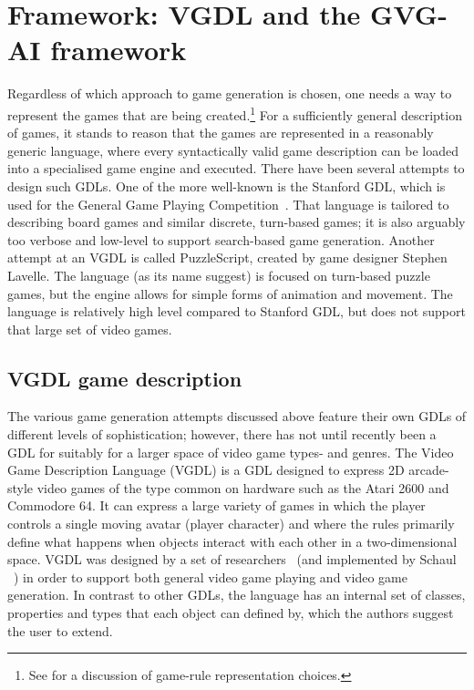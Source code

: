 \documentclass[a4paper,titlepage,final]{report}
\begin{document}
\section{Framework: VGDL and the GVG-AI framework}
\label{sec_gvgaiframework}
Regardless of which approach to game generation is chosen, one needs a way to represent the games that are being created.\footnote{See \citet{pcgbook:ch6} for a discussion of game-rule representation choices.} For a sufficiently general description of games, it stands to reason that the games are represented in a reasonably generic language, where every syntactically valid game description can be loaded into a specialised game engine and executed. 
There have been several attempts to design such GDLs. One of the more well-known is the Stanford GDL, which is used for the General Game Playing Competition~\citet{genesereth2005general}. That language is tailored to describing board games and similar discrete, turn-based games; it is also arguably too verbose and low-level to support search-based game generation. 
Another attempt at an VGDL is called PuzzleScript, created by game designer Stephen Lavelle. The language (as its name suggest) is focused on turn-based puzzle games, but the engine allows for simple forms of animation and movement. The language is relatively high level compared to Stanford GDL, but does not support that large set of video games.


\subsection{VGDL game description}
\label{ssec_vgdl}
The various game generation attempts discussed above feature their own GDLs of different levels of sophistication; however, there has not until recently been a GDL for suitably for a larger space of video game types- and genres.
The Video Game Description Language (VGDL) is a GDL designed to express 2D arcade-style video games of the type common on hardware such as the Atari 2600 and Commodore 64. It can express a large variety of games in which the player controls a single moving avatar (player character) and where the rules primarily define what happens when objects interact with each other in a two-dimensional space. VGDL was designed by a set of researchers~\citet{levine2013general,ebner2013towards} (and implemented by Schaul ~\citet{schaul2013video}) in order to support both general video game playing and video game generation.
In contrast to other GDLs, the language has an internal set of classes, properties and types that each object can defined by, which the authors suggest the user to extend.
\end{document}
